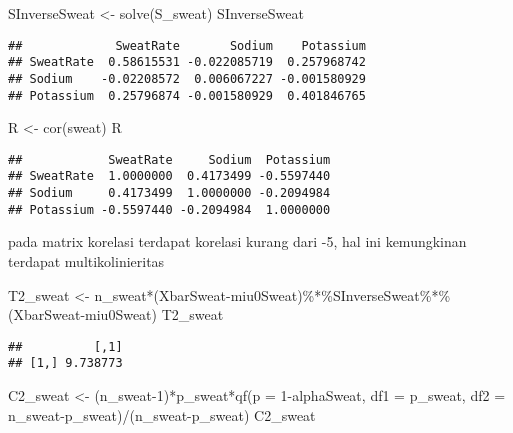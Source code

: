 \documentclass[
]{article}
\newenvironment{Shaded}{\begin{snugshade}}{\end{snugshade}}
\newcommand{\AttributeTok}[1]{\textcolor[rgb]{0.77,0.63,0.00}{#1}}
\newcommand{\DecValTok}[1]{\textcolor[rgb]{0.00,0.00,0.81}{#1}}
\newcommand{\FunctionTok}[1]{\textcolor[rgb]{0.00,0.00,0.00}{#1}}
\newcommand{\NormalTok}[1]{#1}
\newcommand{\OtherTok}[1]{\textcolor[rgb]{0.56,0.35,0.01}{#1}}
\newcommand{\SpecialCharTok}[1]{\textcolor[rgb]{0.00,0.00,0.00}{#1}}
\begin{document}
\begin{Shaded}
\begin{Highlighting}[]
\NormalTok{SInverseSweat }\OtherTok{\textless{}{-}} \FunctionTok{solve}\NormalTok{(S\_sweat)}
\NormalTok{SInverseSweat}
\end{Highlighting}
\end{Shaded}

\begin{verbatim}
##             SweatRate       Sodium    Potassium
## SweatRate  0.58615531 -0.022085719  0.257968742
## Sodium    -0.02208572  0.006067227 -0.001580929
## Potassium  0.25796874 -0.001580929  0.401846765
\end{verbatim}

\begin{Shaded}
\begin{Highlighting}[]
\NormalTok{R }\OtherTok{\textless{}{-}} \FunctionTok{cor}\NormalTok{(sweat)}
\NormalTok{R}
\end{Highlighting}
\end{Shaded}

\begin{verbatim}
##            SweatRate     Sodium  Potassium
## SweatRate  1.0000000  0.4173499 -0.5597440
## Sodium     0.4173499  1.0000000 -0.2094984
## Potassium -0.5597440 -0.2094984  1.0000000
\end{verbatim}

pada matrix korelasi terdapat korelasi kurang dari -5, hal ini
kemungkinan terdapat multikolinieritas

\begin{Shaded}
\begin{Highlighting}[]
\NormalTok{T2\_sweat }\OtherTok{\textless{}{-}}\NormalTok{ n\_sweat}\SpecialCharTok{*}\NormalTok{(XbarSweat}\SpecialCharTok{{-}}\NormalTok{miu0Sweat)}\SpecialCharTok{\%*\%}\NormalTok{SInverseSweat}\SpecialCharTok{\%*\%}\NormalTok{(XbarSweat}\SpecialCharTok{{-}}\NormalTok{miu0Sweat)}
\NormalTok{T2\_sweat}
\end{Highlighting}
\end{Shaded}

\begin{verbatim}
##          [,1]
## [1,] 9.738773
\end{verbatim}

\begin{Shaded}
\begin{Highlighting}[]
\NormalTok{C2\_sweat }\OtherTok{\textless{}{-}}\NormalTok{ (n\_sweat}\DecValTok{{-}1}\NormalTok{)}\SpecialCharTok{*}\NormalTok{p\_sweat}\SpecialCharTok{*}\FunctionTok{qf}\NormalTok{(}\AttributeTok{p =} \DecValTok{1}\SpecialCharTok{{-}}\NormalTok{alphaSweat, }\AttributeTok{df1 =}\NormalTok{ p\_sweat, }\AttributeTok{df2 =}\NormalTok{ n\_sweat}\SpecialCharTok{{-}}\NormalTok{p\_sweat)}\SpecialCharTok{/}\NormalTok{(n\_sweat}\SpecialCharTok{{-}}\NormalTok{p\_sweat)}
\NormalTok{C2\_sweat}
\end{Highlighting}
\end{Shaded}
\end{document}
